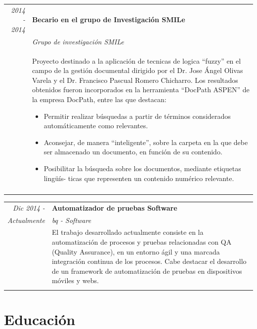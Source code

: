 \documentclass[runningheads,a4paper]{llncs}
\theoremstyle{break}
\begin{document}
\begin{tabular}{r|p{11cm}}
 \emph{2014 - 2014 } & \textbf{Becario en el grupo de Investigación SMILe} \\\textsc{}&\emph{Grupo de investigación SMILe}\\&\footnotesize{Proyecto destinado a la aplicación de tecnicas de logica “fuzzy” en el campo de la gestión documental dirigido por el Dr. Jose Ángel Olivas Varela y el Dr. Francisco Pascual Romero Chicharro. Los resultados obtenidos fueron incorporados en la herramienta “DocPath ASPEN” de la empresa DocPath, entre las que destacan:
\begin{itemize}
	\item Permitir realizar búsquedas a partir de términos considerados automáticamente como relevantes.
    \item Aconsejar, de manera “inteligente”, sobre la carpeta en la que debe ser almacenado un documento, en función de su contenido.
    \item Posibilitar la búsqueda sobre los documentos, mediante etiquetas lingüís- ticas que representen un contenido numérico relevante.
\end{itemize}
}\\\multicolumn{2}{c}{} \\
 \end{tabular}


\begin{tabular}{r|p{11cm}}
 \emph{Dic 2014 -} & \textbf{Automatizador de pruebas Software} \\\emph{Actualmente}&\emph{bq - Software}\\&\footnotesize{El trabajo desarrollado actualmente consiste en la automatización de procesos y pruebas relacionadas con QA (Quality Assurance), en un entorno ágil y una marcada integración continua de los procesos. Cabe destacar el desarrollo de un framework de automatización de pruebas en dispositivos móviles y webs.}\\\multicolumn{2}{c}{} \\
 \end{tabular}

\pagebreak
\section*{Educación}
\textbf{}
\end{document}
